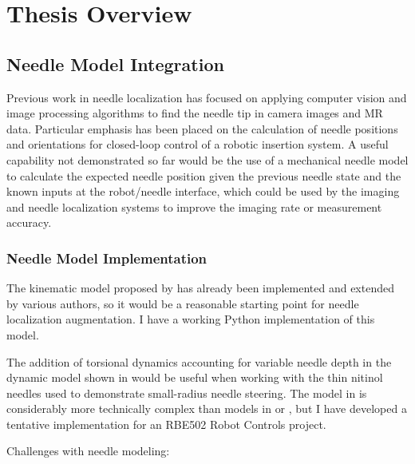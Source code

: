 





\section{Thesis Overview}
\label{sec:Overview}
\subsection{Needle Model Integration}
Previous work in needle localization has focused on applying computer vision and image processing algorithms to find the needle tip in camera images and MR data. Particular emphasis has been placed on the calculation of needle positions and orientations for closed-loop control of a robotic insertion system. A useful capability not demonstrated so far would be the use of a mechanical needle model to calculate the expected needle position given the previous needle state and the known inputs at the robot/needle interface, which could be used by the imaging and needle localization systems to improve the imaging rate or measurement accuracy.

\subsubsection{Needle Model Implementation}
The kinematic model proposed by \cite{WebsterModel} has already been implemented and extended by various authors, so it would be a reasonable starting point for needle localization augmentation. I have a working Python implementation of this model.

The addition of torsional dynamics accounting for variable needle depth in the dynamic model shown in \cite{SwensenDynamics} would be useful when working with the thin nitinol needles used to demonstrate small-radius needle steering. The model in \cite{SwensenDynamics} is considerably more technically complex than models in \cite{WebsterModel} or \cite{ReedDynamics}, but I have developed a tentative implementation for an RBE502 Robot Controls project.

Challenges with needle modeling:

